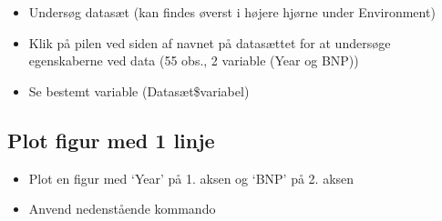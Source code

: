 \documentclass[
  12pt,
]{article}
\newenvironment{Shaded}{\begin{snugshade}}{\end{snugshade}}
\newcommand{\AttributeTok}[1]{\textcolor[rgb]{0.77,0.63,0.00}{#1}}
\newcommand{\DecValTok}[1]{\textcolor[rgb]{0.00,0.00,0.81}{#1}}
\newcommand{\FunctionTok}[1]{\textcolor[rgb]{0.00,0.00,0.00}{#1}}
\newcommand{\NormalTok}[1]{#1}
\newcommand{\SpecialCharTok}[1]{\textcolor[rgb]{0.00,0.00,0.00}{#1}}
\newcommand{\StringTok}[1]{\textcolor[rgb]{0.31,0.60,0.02}{#1}}
\providecommand{\tightlist}{%
  \setlength{\itemsep}{0pt}\setlength{\parskip}{0pt}}
\begin{document}
\begin{itemize}
\tightlist
\item
  Undersøg datasæt (kan findes øverst i højere hjørne under Environment)
\item
  Klik på pilen ved siden af navnet på datasættet for at undersøge
  egenskaberne ved data (55 obs., 2 variable (Year og BNP))
\item
  Se bestemt variable (Datasæt\$variabel)
\end{itemize}

\begin{Shaded}
\end{Shaded}

\hypertarget{plot-figur-med-1-linje}{%
\subsection{Plot figur med 1 linje}\label{plot-figur-med-1-linje}}

\begin{itemize}
\tightlist
\item
  Plot en figur med `Year' på 1. aksen og `BNP' på 2. aksen
\item
  Anvend nedenstående kommando
\end{itemize}

\begin{Shaded}
\end{Shaded}
\end{document}
